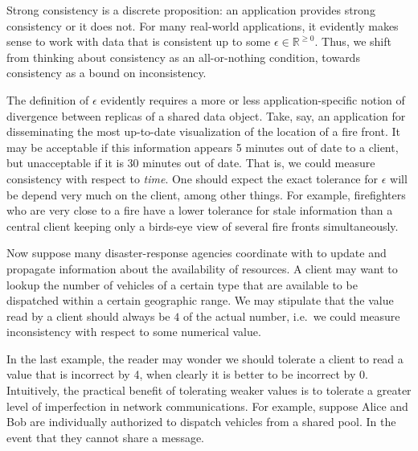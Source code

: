 \documentclass[]             %
{NASA}                       %
\theoremstyle{definition}
\begin{document}



Strong consistency is a discrete proposition: an application provides
strong consistency or it does not. For many real-world applications, it
evidently makes sense to work with data that is consistent up to some
\(\epsilon \in \mathbb{R}^{\geq 0}\). Thus, we shift from thinking about
consistency as an all-or-nothing condition, towards consistency as a
bound on inconsistency.

The definition of \(\epsilon\) evidently requires a more or less
application-specific notion of divergence between replicas of a shared
data object. Take, say, an application for disseminating the most
up-to-date visualization of the location of a fire front. It may be
acceptable if this information appears 5 minutes out of date to a
client, but unacceptable if it is 30 minutes out of date. That is, we
could measure consistency with respect to \emph{time}. One should expect
the exact tolerance for \(\epsilon\) will be depend very much on the
client, among other things. For example, firefighters who are very close
to a fire have a lower tolerance for stale information than a central
client keeping only a birds-eye view of several fire fronts
simultaneously.

Now suppose many disaster-response agencies coordinate with to update
and propagate information about the availability of resources. A client
may want to lookup the number of vehicles of a certain type that are
available to be dispatched within a certain geographic range. We may
stipulate that the value read by a client should always be \(4\) of the
actual number, i.e.~we could measure inconsistency with respect to some
numerical value.

In the last example, the reader may wonder we should tolerate a client
to read a value that is incorrect by 4, when clearly it is better to be
incorrect by 0. Intuitively, the practical benefit of tolerating weaker
values is to tolerate a greater level of imperfection in network
communications. For example, suppose Alice and Bob are individually
authorized to dispatch vehicles from a shared pool. In the event that
they cannot share a message.
\end{document}
